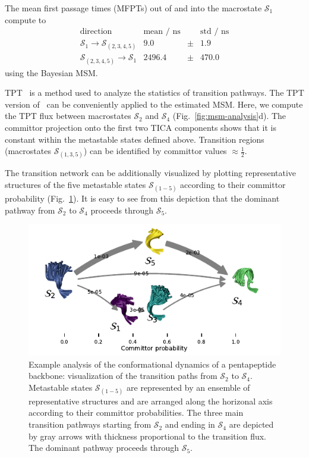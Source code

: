 \documentclass[9pt,tutorial]{livecoms}
\begin{document}
The mean first passage times (MFPTs) out of and into the macrostate $\mathcal{S}_1$ compute to
\[ \begin{array}{crcr}
\textrm{direction} & \textrm{mean / ns} && \textrm{std / ns} \\
\hline
\mathcal{S}_1 \to \mathcal{S}_{(2,3,4,5)} & 9.0 & \pm & 1.9 \\
\mathcal{S}_{(2,3,4,5)} \to \mathcal{S}_1 & 2496.4 & \pm &  470.0
\end{array}\]
using the Bayesian MSM.

TPT~\cite{weinan-tpt,metzner-msm-tpt} is a method used to analyze the statistics of transition pathways.
The TPT version of~\cite{noe-folding-pathways} can be conveniently applied to the estimated MSM.
Here, we compute the TPT flux between macrostates $\mathcal{S}_2$ and $\mathcal{S}_4$ (Fig.~\ref{fig:msm-analysis}d).
The committor projection onto the first two TICA components shows that it is constant within the metastable states defined above.
Transition regions (macrostates $\mathcal{S}_{(1,3,5)}$) can be identified by committor values $\approx \frac{1}{2}$.

The transition network can be additionally visualized by plotting representative structures of the five metastable states $\mathcal{S}_{(1-5)}$ according to their committor probability (Fig.~\ref{fig:tpt-network}).
It is easy to see from this depiction that the dominant pathway from $\mathcal{S}_2$ to $\mathcal{S}_4$ proceeds through $\mathcal{S}_5$.

\begin{figure}
\includegraphics{figure_5}
\caption{Example analysis of the conformational dynamics of a pentapeptide backbone:
visualization of the transition paths from $\mathcal{S}_2$ to $\mathcal{S}_4$.
Metastable states $\mathcal{S}_{(1-5)}$ are represented by an ensemble of representative structures and are arranged along the horizonal axis according to their committor probabilities. The three main transition pathways starting from $\mathcal{S}_2$ and ending in $\mathcal{S}_4$ are depicted by gray arrows with thickness proportional to the transition flux. The dominant pathway proceeds through $\mathcal{S}_5$.}
\label{fig:tpt-network}
\end{figure}
\end{document}
